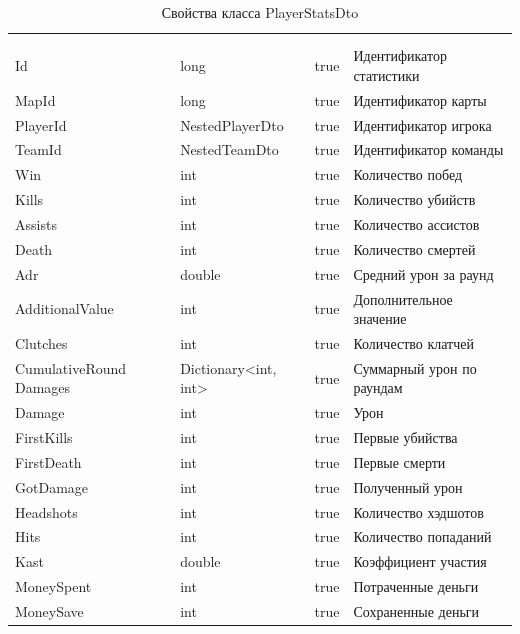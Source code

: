 \begin{xltabular}{\textwidth}{|X|X|X|X|}
	\caption{Свойства класса PlayerStatsDto}\label{table:PlayerStatsDto}\\ \hline
	 &  &  &  \\ \hline
	 &  &  &  \\ \hline
	\endfirsthead
	 \hline
	 &  &  &  \\ \hline
	\endhead
	Id & long & true & Идентификатор статистики \\ \hline
	MapId & long & true & Идентификатор карты \\ \hline
	PlayerId & NestedPlayerDto & true & Идентификатор игрока \\ \hline
	TeamId & NestedTeamDto & true & Идентификатор команды \\ \hline
	Win & int & true & Количество побед \\ \hline
	Kills & int & true & Количество убийств \\ \hline
	Assists & int & true & Количество ассистов \\ \hline
	Death & int & true & Количество смертей \\ \hline
	Adr & double & true & Средний урон за раунд \\ \hline
	AdditionalValue & int & true & Дополнительное значение \\ \hline
	Clutches & int & true & Количество клатчей \\ \hline
	CumulativeRound
	Damages & Dictionary<int, int> & true & Суммарный урон по раундам \\ \hline
	Damage & int & true & Урон \\ \hline
	FirstKills & int & true & Первые убийства \\ \hline
	FirstDeath & int & true & Первые смерти \\ \hline
	GotDamage & int & true & Полученный урон \\ \hline
	Headshots & int & true & Количество хэдшотов \\ \hline
	Hits & int & true & Количество попаданий \\ \hline
	Kast & double & true & Коэффициент участия \\ \hline
	MoneySpent & int & true & Потраченные деньги \\ \hline
	MoneySave & int & true & Сохраненные деньги \\ \hline

\end{xltabular}
